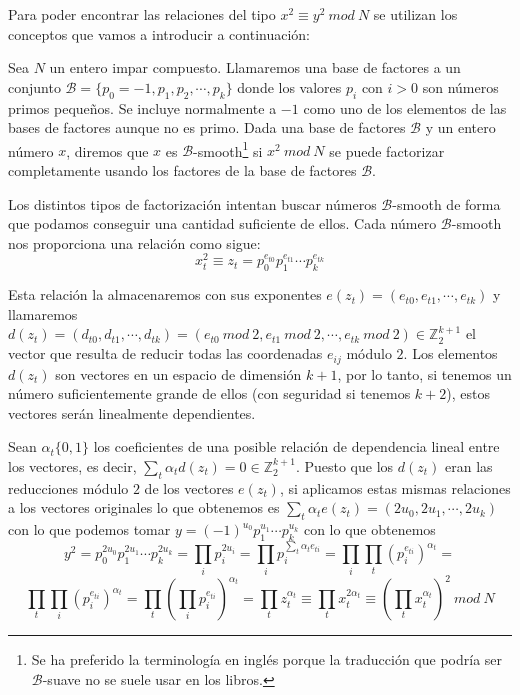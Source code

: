 Para poder encontrar las relaciones del tipo $x^2 \equiv y^2 ~mod~N$ se utilizan
los conceptos que vamos a introducir a continuaci\'on:

\begin{definition}
Sea $N$ un entero impar compuesto. Llamaremos una base de factores a un conjunto
${\mathcal B} = \{ p_0 = -1, p_1, p_2, \cdots, p_k \}$ donde los valores $p_i$ con $i>0$ son
n\'umeros primos peque\~nos. Se incluye normalmente a $-1$ como uno de los
elementos de las bases de factores aunque no es primo.
Dada una base de factores ${\mathcal B}$ y un entero n\'umero $x$, diremos
que $x$ es ${\mathcal B}$-smooth\footnote{Se ha preferido la terminolog\'ia en
ingl\'es porque la traducci\'on que podr\'ia ser ${\mathcal B}$-suave no se
suele usar en los libros.} si $x^2~mod~N$ se puede factorizar
completamente usando los factores de la base de factores ${\mathcal B}$.
\end{definition}

Los distintos tipos de factorizaci\'on intentan buscar n\'umeros ${\mathcal B}$-smooth
de forma que podamos conseguir una cantidad suficiente de ellos. Cada n\'umero ${\mathcal B}$-smooth nos
proporciona una relaci\'on como sigue:
\[ x_t^2 \equiv z_t = p_0^{e_{t0}} p_1^{e_{t1}} \cdots p_k^{e_{tk}} \]

Esta relaci\'on la almacenaremos con sus exponentes $e(z_t) = (e_{t0},e_{t1},\cdots,e_{tk})$ y llamaremos
$d(z_t) = (d_{t0},d_{t1},\cdots,d_{tk}) = (e_{t0}~mod~2,e_{t1}~mod~2,\cdots,e_{tk}~mod~2) \in
{\mathbb Z}_2^{k+1}$ el vector que resulta de reducir todas las coordenadas $e_{ij}$ m\'odulo $2$.
Los elementos $d(z_t)$ son vectores en un espacio de dimensi\'on $k+1$, por lo tanto,
si tenemos un n\'umero suficientemente grande de ellos (con seguridad si tenemos $k+2$), estos
vectores ser\'an linealmente dependientes.

Sean $\alpha_t \{0,1\}$ los coeficientes de una posible relaci\'on de dependencia lineal entre los
vectores, es decir, $\sum_{t} \alpha_t d(z_t) = 0 \in {\mathbb Z}_2^{k+1}$. Puesto que los $d(z_t)$ eran las reducciones m\'odulo $2$ de los vectores $e(z_t)$, si
aplicamos estas mismas relaciones a los vectores originales lo que obtenemos es $\sum_t \alpha_t e(z_t) = (2u_0, 2u_1, \cdots, 2u_k)$ con lo que podemos
tomar $y= (-1)^{u_0} p_1 ^ {u_1} \cdots p_k^{u_k}$ con lo que obtenemos
\[
y^2 =  p_0^{2u_0} p_1 ^ {2u_1} \cdots p_k^{2u_k} = \prod_{i} p_i^{2u_i} = \prod_i p_i^{\sum_t \alpha_t e_{ti}} =
\prod_i \prod_t \left(p_i^{e_{ti}}\right)^{\alpha_t} = \] \[\prod_t \prod_i \left(p_i^{e_{ti}}\right)^{\alpha_t} = \prod_t \left(\prod_i p_i^{e_{ti}}\right)^{\alpha_t} = \prod_t z_t^{\alpha_t} \equiv
\prod_t x_t^{2\alpha_t} \equiv \left( \prod_t x_t^{\alpha_t}\right)^2~mod~N
\]


